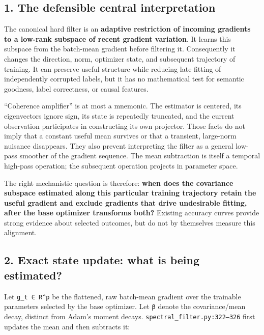 \documentclass[
  british,
  10pt,
  a4paper,
]{article}
\begin{document}
\subsection{1. The defensible central
interpretation}\label{mathematical-audit--the-defensible-central-interpretation}

The canonical hard filter is an \textbf{adaptive restriction of incoming
gradients to a low-rank subspace of recent gradient variation}. It
learns this subspace from the batch-mean gradient before filtering it.
Consequently it changes the direction, norm, optimizer state, and
subsequent trajectory of training. It can preserve useful structure
while reducing late fitting of independently corrupted labels, but it
has no mathematical test for semantic goodness, label
correctness,\allowbreak{} or causal features.

``Coherence amplifier'' is at most a mnemonic. The estimator is
centered, its eigenvectors ignore sign, its state is repeatedly
truncated, and the current observation participates in constructing its
own projector. Those facts do not imply that a constant useful mean
survives or that a transient, large-norm nuisance
disappears.\allowbreak{} They also prevent interpreting the filter as a
general low-pass smoother of the gradient sequence. The mean subtraction
is itself a temporal high-pass operation; the subsequent operation
projects in parameter space.

The right mechanistic question is therefore: \textbf{when does the
covariance subspace estimated along this particular training trajectory
retain the useful gradient and exclude gradients that drive undesirable
fitting, after the base optimizer transforms both?} Existing accuracy
curves provide strong evidence about selected outcomes, but do not by
themselves measure this alignment.

\subsection{2. Exact state update: what is being
estimated?}\label{mathematical-audit--exact-state-update-what-is-being-estimated}

Let \texttt{g\_t\ ∈\ R\^{}p} be the flattened, raw batch-mean gradient
over the trainable parameters selected by the base optimizer. Let
\texttt{β} denote the covariance/\allowbreak{}mean decay, distinct from
Adam's moment decays.
\texttt{spectral\_\allowbreak{}filter.\allowbreak{}py:\allowbreak{}322–326}
first updates the mean and then subtracts it:
\end{document}
